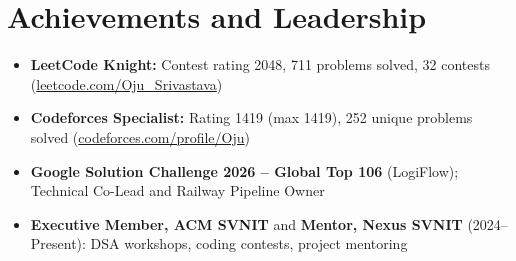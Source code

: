 \documentclass[a4paper,10pt]{article}
\begin{document}
\section{Achievements and Leadership}
\small
\begin{itemize}
  \item \textbf{LeetCode Knight:} Contest rating 2048, 711 problems solved, 32 contests (\href{https://leetcode.com/Oju_Srivastava}{leetcode.com/Oju\_Srivastava})
  \item \textbf{Codeforces Specialist:} Rating 1419 (max 1419), 252 unique problems solved (\href{https://codeforces.com/profile/Oju}{codeforces.com/profile/Oju})
  \item \textbf{Google Solution Challenge 2026 -- Global Top 106} (LogiFlow); Technical Co-Lead and Railway Pipeline Owner
  \item \textbf{Executive Member, ACM SVNIT} and \textbf{Mentor, Nexus SVNIT} (2024--Present): DSA workshops, coding contests, project mentoring
\end{itemize}
\end{document}
